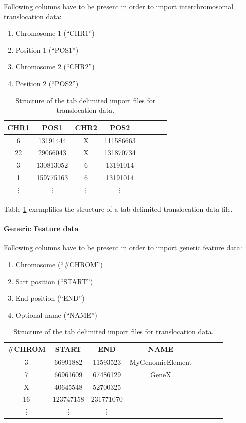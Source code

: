 \documentclass[11pt,final]{article}
\begin{document}
Following columns have to be present in order to import interchromosomal
translocation data:

\begin{enumerate}
  \item Chromosome 1 (``CHR1'')
  \item Position 1 (``POS1'')
  \item Chromosome 2 (``CHR2'')
  \item Position 2 (``POS2'')
\end{enumerate}

\begin{table}
	\centering
	\begin{tabular}[h]{|c|c|c|c|c|c|c|c|}
	  \hline
	  CHR1 & POS1 & CHR2 & POS2 \\ \hline
	 6 & 13191444 & X & 111586663 \\
         22 & 29066043 & X & 131870734 \\
         3 & 130813052 & 6 & 13191014 \\
         1 & 159775163 & 6 & 13191014 \\
	 \vdots & \vdots & \vdots & \vdots \\
	\end{tabular}
	\caption{Structure of the tab delimited import files for translocation
	data.}
	\label{tab:tsv_transloc}
\end{table}

Table \ref{tab:tsv_transloc} exemplifies the structure of a tab delimited
translocation data file.

\paragraph{Generic Feature data}

Following columns have to be present in order to import generic feature data:

\begin{enumerate}
  \item Chromosome (``\#CHROM'')
  \item Sart position (``START'')
  \item End position (``END'')
  \item Optional name  (``NAME'')
\end{enumerate}

\begin{table}
	\centering
	\begin{tabular}[h]{|c|c|c|c|c|c|c|c|}
	  \hline
	  \#CHROM & START & END & NAME\\ \hline
	 3 & 66991882 & 11593523 & MyGenomicElement\\
         7 & 66961609 & 67486129 & GeneX\\
         X & 40645548 & 52700325 & \\
         16 & 123747158 & 231771070 & \\
	 \vdots & \vdots & \vdots \\
	\end{tabular}
	\caption{Structure of the tab delimited import files for translocation
	data.}
	\label{tab:tsv_gen}
\end{table}
\end{document}
